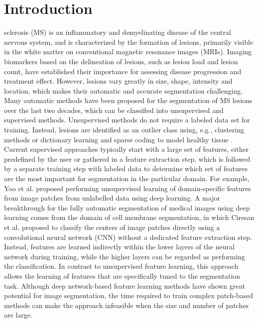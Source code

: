\section{Introduction}

sclerosis (MS) is an inflammatory and demyelinating disease of the central
nervous system, and is characterized by the formation of lesions, primarily
visible in the white matter on conventional magnetic resonance images (MRIs).
Imaging biomarkers based on the delineation of lesions, such as lesion load and
lesion count, have established their importance for assessing disease
progression and treatment effect. However, lesions vary greatly in size, shape,
intensity and location, which makes their automatic and accurate segmentation
challenging. Many automatic methods have been proposed for the segmentation of
MS \mbox{lesions} over the last two decades, which can be classified into
unsupervised and supervised methods. Unsupervised methods do not require a
labeled data set for training. Instead, lesions are identified as an outlier
class using, e.g., clustering methods \cite{souplet2008} or dictionary learning
and sparse coding to model healthy tissue \cite{weiss2013}. Current supervised
approaches typically start with a large set of features, either predefined by
the user \cite{geremia2010} or gathered in a feature extraction step, which is
followed by a separate training step with labeled data to determine which set of
features are the most important for segmentation in the particular domain. For
example, Yoo et al. \cite{yoo2014} proposed performing unsupervised learning of
domain-specific features from image patches from unlabelled data using deep
learning. A major breakthrough for the fully automatic segmentation of medical
images using deep learning comes from the domain of cell membrane segmentation,
in which Ciresan et al. \cite{Ciresan2012} proposed to classify the centers of
image patches directly using a convolutional neural network (CNN)
\cite{LeCun1998} without a dedicated feature extraction step. Instead, features
are learned indirectly within the lower layers of the neural network during
training, while the higher layers can be regarded as performing the
classification. In contrast to unsupervised feature learning, this approach
allows the learning of features that are specifically tuned to the segmentation
task. Although deep network-based feature learning methods have shown great
potential for image segmentation, the time required to train complex patch-based
methods can make the approach infeasible when the size and number of patches are
large.

